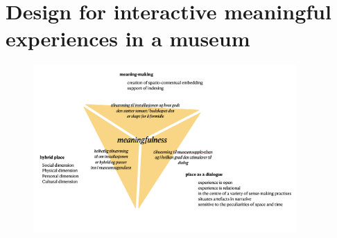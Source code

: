 
\section{Design for interactive meaningful experiences in a museum}

\begin{figure}[h]
\includegraphics[width=10cm]{pictures/meaningfullness_triangle.png}
\centering 
\end{figure}


